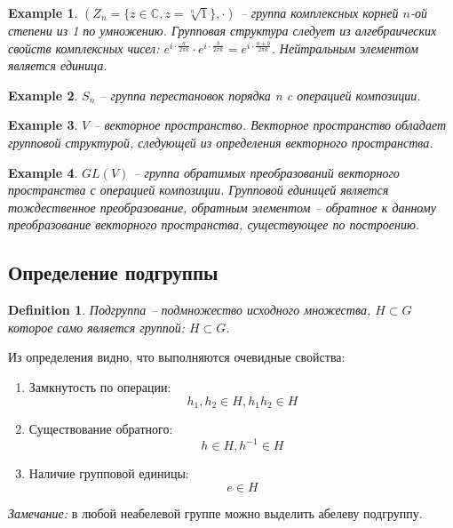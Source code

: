 \documentclass[10pt,a4paper]{article}
\newtheorem{defin}{Definition}
\newtheorem{exmpl}{Example}
\begin{document}
		\begin{exmpl}
			$\left(Z_{n} = \lbrace z \in \mathbb{C}, z = \sqrt[n]{1}\rbrace, 
			\cdot\right)$ -- группа комплексных корней $n$-ой степени из 1 по
			умножению. Групповая структура следует из алгебраических свойств
			комплексных чисел: $e^{i\cdot\frac{a}{2\pi k}} \cdot 
			e^{i\cdot\frac{b}{2\pi k}} = e^{i\cdot\frac{a + b}{2\pi k}}$.
			Нейтральным элементом является единица.
		\end{exmpl}
		
		\begin{exmpl}
			$ S_{n}$ -- группа перестановок порядка n c операцией композиции.
		\end{exmpl}
		
		\begin{exmpl}
			$V$ -- векторное пространство. Векторное пространство обладает 	
			групповой структурой, следующей из определения векторного 
			пространства.
		\end{exmpl}
		
		\begin{exmpl}
			$GL\left(V\right)$ -- группа обратимых преобразований векторного 	
			пространства с операцией композиции. Групповой единицей является 
			тождественное преобразование, обратным элементом -- обратное к
			данному преобразование векторного пространства, существующее по 
			построению.
		\end{exmpl}

		\subsection{Определение подгруппы}		
		
		\begin{defin}
			Подгруппа -- подмножество исходного множества, $H \subset G$ 
			которое само является группой: $H \subset G$.
		\end{defin}
		
		Из определения видно, что выполняются очевидные свойства:
		
		\begin{enumerate}
			\item Замкнутость по операции:
				$$h_{1}, h_{2} \in H, h_{1}h_{2} \in H$$
			\item Существование обратного: 
				$$h \in H, h^{-1} \in H$$
			\item Наличие групповой единицы:
				$$e \in H$$
		\end{enumerate}

		\textit{Замечание:} в любой неабелевой группе можно выделить абелеву
		 подгруппу.
\end{document}
